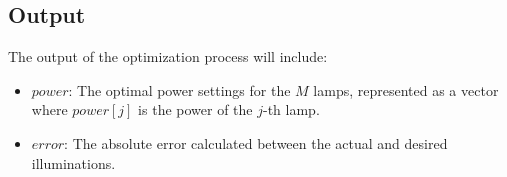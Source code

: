 \documentclass{article}
\begin{document}
\subsection*{Output}
The output of the optimization process will include:

\begin{itemize}
    \item \(power\): The optimal power settings for the \(M\) lamps, represented as a vector where \(power[j]\) is the power of the \(j\)-th lamp.
    \item \(error\): The absolute error calculated between the actual and desired illuminations.
\end{itemize}
\end{document}
